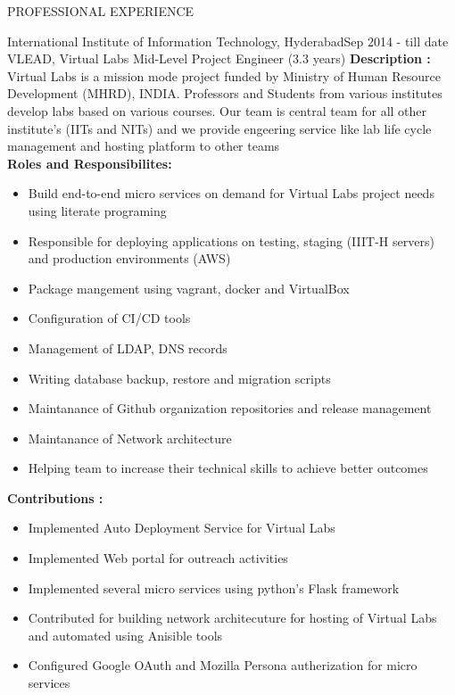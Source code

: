\documentclass{resume} %
\begin{document}
\begin{rSection}{PROFESSIONAL EXPERIENCE}

   \begin{rSubsection}
    {International Institute of Information Technology, Hyderabad}{Sep 2014 -
      till date} {VLEAD, Virtual Labs} {Mid-Level Project Engineer (3.3 years)}
    \hfill \break
    \textbf{Description :} Virtual Labs is a mission mode project funded by
    Ministry of Human Resource Development (MHRD), INDIA. Professors and
    Students from various institutes develop labs based on various courses. Our
    team is central team for all other institute's (IITs and NITs) and we
    provide engeering service like lab life cycle management and hosting
    platform to other teams \\

    \textbf{Roles and Responsibilites:}
    \begin{itemize}
    \item Build end-to-end micro services on demand for Virtual Labs project
      needs using literate programing
    \item Responsible for deploying applications on testing, staging (IIIT-H
      servers) and production environments (AWS)
    \item Package mangement using vagrant, docker and VirtualBox
    \item Configuration of CI/CD tools
    \item Management of LDAP, DNS records
    \item Writing database backup, restore and migration scripts
    \item Maintanance of Github organization repositories and release
      management
    \item Maintanance of Network architecture
    \item Helping team to increase their technical skills to achieve better
      outcomes
    \end{itemize}

    \hfill

    \textbf{Contributions : }
    \begin{itemize}
    \item Implemented Auto Deployment Service for Virtual Labs
    \item Implemented Web portal for outreach activities
    \item Implemented several micro services using python's Flask framework
    \item Contributed for building network architecuture for hosting of Virtual
      Labs and automated using Anisible tools
    \item Configured Google OAuth and Mozilla Persona autherization for micro
      services
    \end{itemize}
  \end{rSubsection}

\end{rSection}
\end{document}
